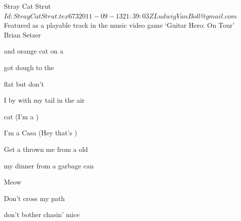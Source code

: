 \begin{SBSong}{Stray Cat Strut}
  {$Id: StrayCatStrut.tex 673 2011-09-13 21:39:03Z LudwigVanBoll@gmail.com $}
  {Featured as a playable track in the music video game `Guitar Hero: On Tour'}
  {Brian Setzer}
   \begin{SBVerse}
     and orange  cat  on a     
  
     got  dough to  the     
    
     flat  but  don't  
    
    I   by with my tail in the air 

     cat  (I'm a  )
    
    I'm a  Casa (Hey  that's )
    
    Get a  thrown  me from a  old  
    
     my dinner from a garbage can 
    
        Meow 
    
        Don't cross my path
  \end{SBVerse}
  \CBPageBrk
  \begin{SBVerse}
     don't bother chasin' mice 
    

\end{SBVerse}
\end{SBSong}

